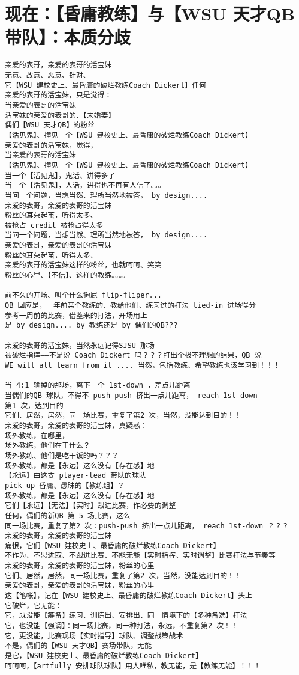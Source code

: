 \documentclass[9pt, b5paper]{article}
\begin{document}
\section{现在：【昏庸教练】与【WSU 天才QB 带队】：本质分歧}
\label{sec-10}
\begin{verbatim}
亲爱的表哥，亲爱的表哥的活宝妹
无意、故意、恶意、针对、
它【WSU 建校史上、最昏庸的破烂教练Coach Dickert】任何
亲爱的表哥的活宝妹，只是觉得：
当亲爱的表哥的活宝妹
活宝妹的亲爱的表哥的、【未婚妻】
偶们【WSU 天才QB】的粉丝
【活见鬼】、撞见一个【WSU 建校史上、最昏庸的破烂教练Coach Dickert】
亲爱的表哥的活宝妹，觉得，
当亲爱的表哥的活宝妹
【活见鬼】、撞见一个【WSU 建校史上、最昏庸的破烂教练Coach Dickert】
当一个【活见鬼】，鬼话、讲得多了
当一个【活见鬼】，人话，讲得也不再有人信了。。。
当问一个问题，当想当然、理所当然地被答， by design....
亲爱的表哥，亲爱的表哥的活宝妹
粉丝的耳朵起茧，听得太多、
被抢占 credit 被抢占得太多
当问一个问题，当想当然、理所当然地被答， by design....
亲爱的表哥，亲爱的表哥的活宝妹
粉丝的耳朵起茧，听得太多、
亲爱的表哥的活宝妹这样的粉丝，也就呵呵、笑笑
粉丝的心里、【不信】、这样的教练。。。。

前不久的开场、叫个什么狗屁 flip-fliper...
QB 回应是，一年前某个教练的、教给他们、练习过的打法 tied-in 进场得分
参考一周前的比赛，借鉴来的打法，开场用上
是 by design.... by 教练还是 by 偶们的QB???

亲爱的表哥的活宝妹，当然永远记得SJSU 那场
被破烂指挥——不是说 Coach Dickert 吗？？？打出个极不理想的结果，QB 说
WE will all learn from it .... 当然，包括教练、希望教练也该学习到！！！

当 4:1 输掉的那场，离下一个 1st-down ，差点儿距离
当偶们的QB 球队，不得不 push-push 挤出一点儿距离， reach 1st-down
第1 次，达到目的
它们、居然，居然，同一场比赛，重复了第2 次，当然，没能达到目的！！
亲爱的表哥，亲爱的表哥的活宝妹，真疑惑：
场外教练，在哪里，
场外教练，他们在干什么？
场外教练、他们是吃干饭的吗？？？
场外教练，都是【永远】这么没有【存在感】地
【永远】由这支 player-lead 带队的球队
pick-up 昏庸、愚昧的【教练组】？
场外教练，都是【永远】这么没有【存在感】地
它们【永远】【无法】【实时】跟进比赛，作必要的调整
任何，偶们的新QB 第 5 场比赛，这么
同一场比赛，重复了第2 次：push-push 挤出一点儿距离， reach 1st-down ？？？
亲爱的表哥，亲爱的表哥的活宝妹
痛恨，它们【WSU 建校史上、最昏庸的破烂教练Coach Dickert】
不作为、不思进取、不跟进比赛、不能无能【实时指挥、实时调整】比赛打法与节奏等
亲爱的表哥，亲爱的表哥的活宝妹，粉丝的心里
它们、居然，居然，同一场比赛，重复了第2 次，当然，没能达到目的！！
亲爱的表哥，亲爱的表哥的活宝妹，粉丝的心里
这【笔帐】，记在【WSU 建校史上、最昏庸的破烂教练Coach Dickert】头上
它破烂，它无能：
它，既没能【筹备】练习、训练出、安排出、同一情境下的【多种备选】打法
它，也没能【强调】：同一场比赛，同一种打法，永远，不重复第2 次！！
它，更没能，比赛现场【实时指导】球队、调整战策战术
不是，偶们的【WSU 天才QB】赛场带队，无能
是它，【WSU 建校史上、最昏庸的破烂教练Coach Dickert】
呵呵呵，【artfully 安排球队球队】用人唯私，教无能，是【教练无能】！！！


\end{verbatim}
\end{document}
